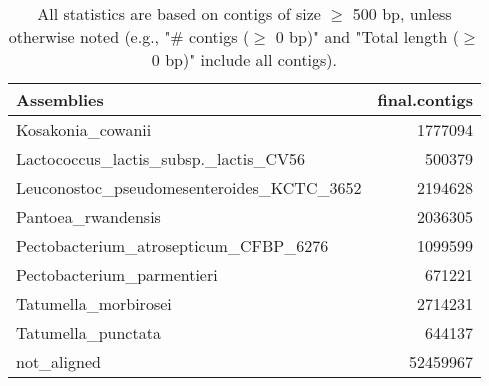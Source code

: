 \documentclass[12pt,a4paper]{article}
\begin{document}
\begin{table}[ht]
\begin{center}
\caption{All statistics are based on contigs of size $\geq$ 500 bp, unless otherwise noted (e.g., "\# contigs ($\geq$ 0 bp)" and "Total length ($\geq$ 0 bp)" include all contigs).}
\begin{tabular}{|l*{1}{|r}|}
\hline
Assemblies & final.contigs \\ \hline
Kosakonia\_cowanii & 1777094 \\ \hline
Lactococcus\_lactis\_subsp.\_lactis\_CV56 & 500379 \\ \hline
Leuconostoc\_pseudomesenteroides\_KCTC\_3652 & 2194628 \\ \hline
Pantoea\_rwandensis & 2036305 \\ \hline
Pectobacterium\_atrosepticum\_CFBP\_6276 & 1099599 \\ \hline
Pectobacterium\_parmentieri & 671221 \\ \hline
Tatumella\_morbirosei & 2714231 \\ \hline
Tatumella\_punctata & 644137 \\ \hline
not\_aligned & 52459967 \\ \hline
\end{tabular}
\end{center}
\end{table}
\end{document}

